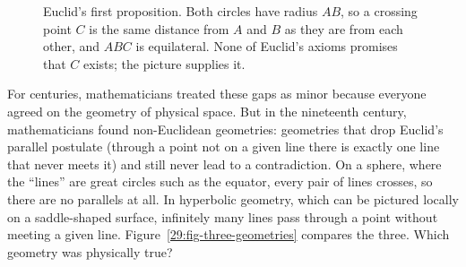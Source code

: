 \begin{figure}[htbp]
\centering
{}
\caption{Euclid's first proposition. Both circles have radius $AB$, so a crossing point $C$ is the same distance from $A$ and $B$ as they are from each other, and $ABC$ is equilateral. None of Euclid's axioms promises that $C$ exists; the picture supplies it.}
\label{29:fig-euclid-circles}
\end{figure}

For centuries, mathematicians treated these gaps as minor because everyone agreed on the geometry of physical space. But in the nineteenth century, mathematicians found non-Euclidean geometries: geometries that drop Euclid's parallel postulate (through a point not on a given line there is exactly one line that never meets it) and still never lead to a contradiction. On a sphere, where the ``lines'' are great circles such as the equator, every pair of lines crosses, so there are no parallels at all. In hyperbolic geometry, which can be pictured locally on a saddle-shaped surface, infinitely many lines pass through a point without meeting a given line. Figure~\ref{29:fig-three-geometries} compares the three. Which geometry was physically true?

